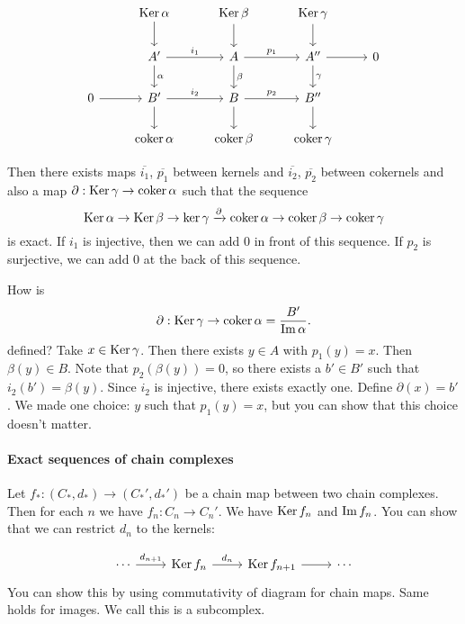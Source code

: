 

\[
    \begin{tikzcd}
        & \Ker \alpha \arrow[d, ""] & \Ker \beta \arrow[d, ""] & \Ker \gamma \arrow[d, ""]\\
        & A' \arrow[d, "\alpha"]\arrow[r, "i_1"] & \arrow[d, "\beta"]A \arrow[r, "p_1"] & A'' \arrow[r, ""] \arrow[d, "\gamma"]& 0\\
        0 \arrow[r, ""] & B' \arrow[r, "i_2"] \arrow[d, ""]& B \arrow[r, "p_2"] \arrow[d, ""]& B'' \arrow[d, ""] &\\
                        & \coker \alpha & \coker \beta & \coker \gamma & 
    \end{tikzcd}
\]

Then there exists maps $\overline{i_1}$, $\overline{p_1}$ between kernels and $ \overline{i_2}$, $ \overline{p_2}$ between cokernels and also a map $\partial: \operatorname{Ker} \gamma \to  \operatorname{coker} \alpha$ such that the sequence
\[
\operatorname{Ker} \alpha \to  \operatorname{Ker} \beta \to  \ker \gamma \xrightarrow{\partial} \operatorname{coker} \alpha \to  \operatorname{coker} \beta \to  \operatorname{coker} \gamma
\] 
is exact.
If $i_1$ is injective, then we can add  $0$ in front of this sequence.
If $p_2$ is surjective, we can add $0$ at the back of this sequence.

How is
\[
\partial: \operatorname{Ker} \gamma \to  \operatorname{coker} \alpha = \frac{B'}{\operatorname{Im} \alpha}
.\] 
defined?
Take $x \in \operatorname{Ker} \gamma$.
Then there exists $y \in A$ with $p_1(y) = x$.
Then $\beta(y) \in B$. Note that $p_2(\beta(y)) = 0$, so there exists a $b' \in B'$ such that $i_2(b') = \beta(y)$.
Since  $i_2$ is injective, there exists exactly one.
Define $\partial(x) = b'$.
We made one choice:  $y$ such that $p_1(y) = x$, but you can show that this choice doesn't matter.

\hr

\paragraph{Exact sequences of chain complexes}
Let $f_*: (C_*, d_*) \to  (C_*', d_*')$ be a chain map between two chain complexes.
Then  for each $n$ we have $f_n: C_n \to  C_n'$.
We have $\operatorname{Ker} f_n$ and  $\operatorname{Im} f_n$.
You can show that we can restrict $d_n$ to the kernels:

\[
    \begin{tikzcd}
        \cdots \arrow[r, "d_{n+1}"] & \Ker f_n \arrow[r, "d_n"] & \Ker f_{n+1} \arrow[r, ""]& \cdots
    \end{tikzcd}
\]
You can show this by using commutativity of diagram for chain maps.
Same holds for images. We call this is a subcomplex.

